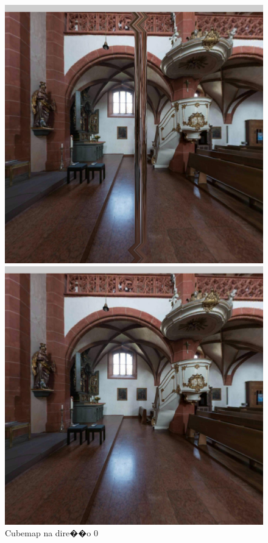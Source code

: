 \documentclass[12pt]{article}
\begin{document}
\begin{figure}[!tbp]
  \centering
  \begin{minipage}[b]{0.3\textwidth}
    \includegraphics[width=1.1\textwidth]{../images/screenshots/Screenshot_0_Equi2Cube.jpg}
    \caption{Cubemap na dire��o 0}
    \label{fig:cubemap_direction_0}
  \end{minipage}
  \hfill
  \begin{minipage}[b]{0.3\textwidth}
    \centering
    \includegraphics[width=1.1\textwidth]{../images/screenshots/Screenshot_0_Skybox.jpg}

\end{minipage}
\end{figure}
\end{document}
